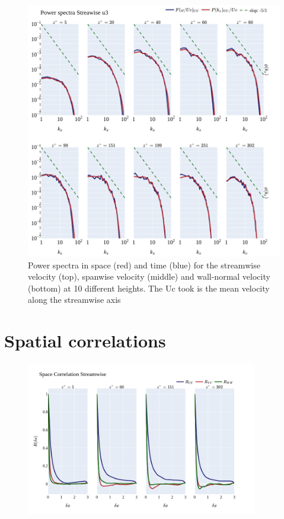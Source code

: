 \documentclass[]{article}
\theoremstyle{plain}
\theoremstyle{remark}
\begin{document}
\begin{figure}[H]
	\begin{center}
		\includegraphics[width=\textwidth]{../../output/figures/channel_wrles_retau395/split_time/frozen_turbulence/power_spectra/u3_all.png}
		\caption{Power spectra in space (red) and time (blue) for the streamwise velocity (top), spanwise velocity (middle) and wall-normal velocity (bottom) at 10 different heights. The Uc took is the mean velocity along the streamwise axis}
	\end{center}
\end{figure}



\section{Spatial correlations}


\begin{figure}[H]
	\begin{center}
		\includegraphics[width=0.9\textwidth]{../../output/figures/channel_wrles_retau395/split_time/space_correlation/streamwise.png}
	\end{center}
\end{figure}
\end{document}
